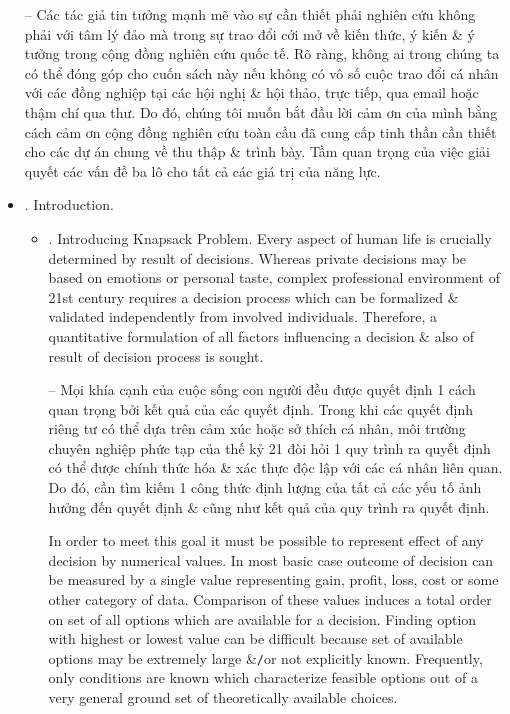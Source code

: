 \documentclass{article}
\begin{document}
\begin{itemize}
    -- Các tác giả tin tưởng mạnh mẽ vào sự cần thiết phải nghiên cứu không phải với tâm lý đảo mà trong sự trao đổi cởi mở về kiến thức, ý kiến \& ý tưởng trong cộng đồng nghiên cứu quốc tế. Rõ ràng, không ai trong chúng ta có thể đóng góp cho cuốn sách này nếu không có vô số cuộc trao đổi cá nhân với các đồng nghiệp tại các hội nghị \& hội thảo, trực tiếp, qua email hoặc thậm chí qua thư. Do đó, chúng tôi muốn bắt đầu lời cảm ơn của mình bằng cách cảm ơn cộng đồng nghiên cứu toàn cầu đã cung cấp tinh thần cần thiết cho các dự án chung về thu thập \& trình bày. Tầm quan trọng của việc giải quyết các vấn đề ba lô cho tất cả các giá trị của năng lực.
    \item {. Introduction.}
    \begin{itemize}
        \item {. Introducing Knapsack Problem.} Every aspect of human life is crucially determined by result of decisions. Whereas private decisions may be based on emotions or personal taste, complex professional environment of 21st century requires a decision process which can be formalized \& validated independently from involved individuals. Therefore, a quantitative formulation of all factors influencing a decision \& also of result of decision process is sought.
        
        -- Mọi khía cạnh của cuộc sống con người đều được quyết định 1 cách quan trọng bởi kết quả của các quyết định. Trong khi các quyết định riêng tư có thể dựa trên cảm xúc hoặc sở thích cá nhân, môi trường chuyên nghiệp phức tạp của thế kỷ 21 đòi hỏi 1 quy trình ra quyết định có thể được chính thức hóa \& xác thực độc lập với các cá nhân liên quan. Do đó, cần tìm kiếm 1 công thức định lượng của tất cả các yếu tố ảnh hưởng đến quyết định \& cũng như kết quả của quy trình ra quyết định.
        
        In order to meet this goal it must be possible to represent effect of any decision by numerical values. In most basic case outcome of decision can be measured by a single value representing gain, profit, loss, cost or some other category of data. Comparison of these values induces a total order on set of all options which are available for a decision. Finding option with highest or lowest value can be difficult because set of available options may be extremely large \&{\tt/}or not explicitly known. Frequently, only conditions are known which characterize feasible options out of a very general ground set of theoretically available choices.
        

\end{itemize}
\end{itemize}
\end{document}
